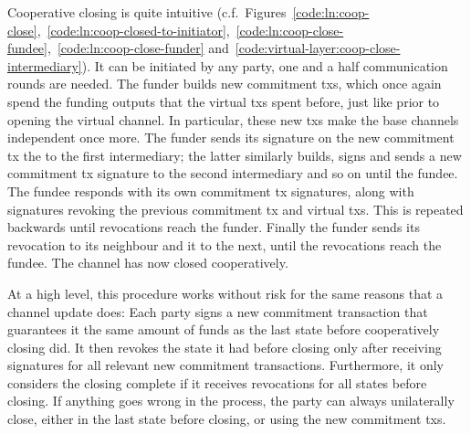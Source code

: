   Cooperative closing is quite intuitive (c.f.\
  Figures~\ref{code:ln:coop-close},~\ref{code:ln:coop-closed-to-initiator},~\ref{code:ln:coop-close-fundee},~\ref{code:ln:coop-close-funder}
  and~\ref{code:virtual-layer:coop-close-intermediary}). It can be initiated by
  any party, one and a half communication rounds are needed. The funder builds
  new commitment txs, which once again spend the funding outputs that the
  virtual txs spent before, just like prior to opening the virtual channel. In
  particular, these new txs make the base channels independent once more. The
  funder sends
  its signature on the new commitment tx the to the first intermediary; the
  latter similarly builds, signs and sends a new commitment tx signature to the
  second intermediary and so on until the fundee. The fundee
  responds with its own commitment tx signatures, along with signatures revoking
  the previous commitment tx and virtual txs. This is repeated backwards until
  revocations reach the funder. Finally the funder sends its revocation to its
  neighbour and it to the next, until the revocations reach the fundee. The
  channel has now closed cooperatively.

  At a high level, this procedure works without risk for the same reasons that a
  channel update does: Each party signs a new commitment transaction that
  guarantees it the same amount of funds as the last state before cooperatively
  closing did. It then revokes the state it had before closing only after
  receiving signatures for all relevant new commitment transactions.
  Furthermore, it only considers the closing complete if it receives revocations
  for all states before closing. If anything goes wrong in the process, the
  party can always unilaterally close, either in the last state before closing,
  or using the new commitment txs.

